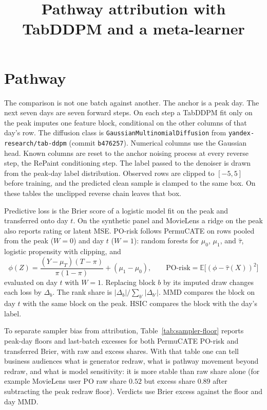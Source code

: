 \documentclass[11pt]{article}
\title{Pathway attribution with TabDDPM and a meta-learner}
\author{}
\date{}
\begin{document}
\maketitle

\section{Pathway}

The comparison is not one batch against another. The anchor is a peak day.
The next seven days are seven forward steps. On each step a TabDDPM fit only
on the peak imputes one feature block, conditional on the other columns of
that day's row. The diffusion class is
\texttt{GaussianMultinomialDiffusion} from \texttt{yandex-research/tab-ddpm}
(commit \texttt{b476257}). Numerical columns use the Gaussian head. Known
columns are reset to the anchor noising process at every reverse step, the
RePaint conditioning step. The label passed to the denoiser is drawn from the
peak-day label distribution. Observed rows are clipped to \([-5,5]\) before
training, and the predicted clean sample is clamped to the same box. On
these tables the unclipped reverse chain leaves that box.

Predictive loss is the Brier score of a logistic model fit on the peak and
transferred onto day \(t\). On the synthetic panel and MovieLens a ridge on
the peak also reports rating or latent MSE. PO-risk follows PermuCATE on
rows pooled from the peak (\(W=0\)) and day \(t\) (\(W=1\)): random forests
for \(\mu_0\), \(\mu_1\), and \(\hat\tau\), logistic propensity with
clipping, and
\[
\phi(Z)=\frac{(Y-\mu_T)(T-\pi)}{\pi(1-\pi)}+(\mu_1-\mu_0),\qquad
\text{PO-risk}=\mathbb{E}\bigl[(\phi-\hat\tau(X))^2\bigr]
\]
evaluated on day \(t\) with \(W=1\). Replacing block \(b\) by its imputed
draw changes each loss by \(\Delta_b\). The rank share is
\(|\Delta_b|/\sum_{b'}|\Delta_{b'}|\). MMD compares the block on day \(t\)
with the same block on the peak. HSIC compares the block with the day's
label.

To separate sampler bias from attribution, Table~\ref{tab:sampler-floor}
reports peak-day floors and last-batch excesses for both PermuCATE PO-risk
and transferred Brier, with raw and excess shares. With that table one can
tell business audiences what is generator redraw, what is pathway movement
beyond redraw, and what is model sensitivity: it is more stable than raw
share alone (for example MovieLens user PO raw share $0.52$ but excess share
$0.89$ after subtracting the peak redraw floor). Verdicts use Brier excess
against the floor and day MMD.
\end{document}
